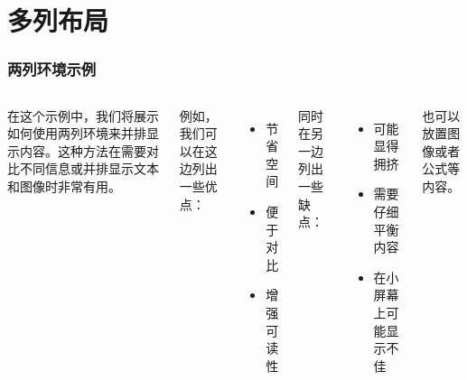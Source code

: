 \documentclass[10pt]{beamer}
\begin{document}
\section{多列布局}
\begin{frame}
\frametitle{两列环境示例}
\begin{columns}
在这个示例中，我们将展示如何使用两列环境来并排显示内容。这种方法在需要对比不同信息或并排显示文本和图像时非常有用。

例如，我们可以在这边列出一些优点：
\begin{itemize}
  \item 节省空间
  \item 便于对比
  \item 增强可读性
\end{itemize}

同时在另一边列出一些缺点：
\begin{itemize}
  \item 可能显得拥挤
  \item 需要仔细平衡内容
  \item 在小屏幕上可能显示不佳
\end{itemize}

也可以放置图像或者公式等内容。
\end{columns}
\end{frame}
\end{document}
